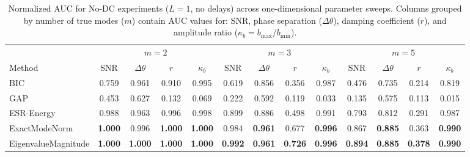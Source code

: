 \begin{table}[t]
\centering
\small
\setlength{\tabcolsep}{3pt}
\begin{tabular}{lcccccccccccc}
\hline
 & \multicolumn{4}{c}{$m = 2$} & \multicolumn{4}{c}{$m = 3$} & \multicolumn{4}{c}{$m = 5$} \\
Method & SNR & $\Delta\theta$ & $r$ & $\kappa_b$ & SNR & $\Delta\theta$ & $r$ & $\kappa_b$ & SNR & $\Delta\theta$ & $r$ & $\kappa_b$ \\
\hline
BIC & 0.759 & 0.961 & 0.910 & 0.995 & 0.619 & 0.856 & 0.356 & 0.987 & 0.476 & 0.735 & 0.214 & 0.819 \\
GAP & 0.453 & 0.627 & 0.132 & 0.069 & 0.222 & 0.592 & 0.119 & 0.033 & 0.135 & 0.575 & 0.113 & 0.015 \\
ESR-Energy & 0.988 & 0.963 & 0.996 & 0.998 & 0.899 & 0.886 & 0.498 & 0.991 & 0.793 & 0.812 & 0.291 & 0.987 \\
ExactModeNorm & \textbf{1.000} & 0.996 & \textbf{1.000} & \textbf{1.000} & 0.984 & \textbf{0.961} & 0.677 & \textbf{0.996} & 0.867 & \textbf{0.885} & 0.363 & \textbf{0.990} \\
EigenvalueMagnitude & \textbf{1.000} & \textbf{1.000} & \textbf{1.000} & \textbf{1.000} & \textbf{0.992} & \textbf{0.961} & \textbf{0.726} & \textbf{0.996} & \textbf{0.894} & \textbf{0.885} & \textbf{0.378} & \textbf{0.990} \\
\hline
\end{tabular}
\caption{Normalized AUC for No-DC experiments ($L=1$, no delays) across one-dimensional parameter sweeps. Columns grouped by number of true modes ($m$) contain AUC values for: SNR, phase separation ($\Delta\theta$), damping coefficient ($r$), and amplitude ratio ($\kappa_b = b_{\max}/b_{\min}$).}
\label{tab:auc_no_dc}
\end{table}
